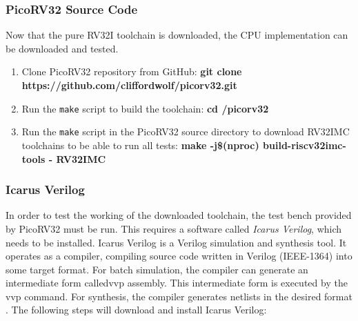 \subsubsection{PicoRV32 Source Code}
 \label{sect6_3_2_2}
Now that the pure RV32I toolchain is downloaded, the CPU implementation can be downloaded and tested.

\begin{enumerate}
\item Clone PicoRV32 repository from GitHub:\newline
\small \textbf{git clone https://github.com/cliffordwolf/picorv32.git}

\item Run the \verb|make| script to build the toolchain:\newline
\small \textbf{cd \texttildelow /picorv32}

\item Run the \verb|make| script in the PicoRV32 source directory to download RV32IMC toolchains to be able to run all tests:\newline
\small \textbf{make -j\$(nproc) build-riscv32imc-tools - RV32IMC}

\end{enumerate}

\subsubsection{Icarus Verilog}
\label{sect6_3_2_3}
In order to test the working of the downloaded toolchain, the test bench provided by PicoRV32 must be run. This requires a software called \textit{Icarus Verilog}, which needs to be installed. Icarus Verilog is a Verilog simulation and synthesis tool. It operates as a compiler, compiling source code written in Verilog (IEEE-1364) into some target format. For batch simulation, the compiler can generate an intermediate form calledvvp assembly. This intermediate form is executed by the vvp command. For synthesis, the compiler generates netlists in the desired format \cite{iverilog_wil}. The following steps will download and install Icarus Verilog:


